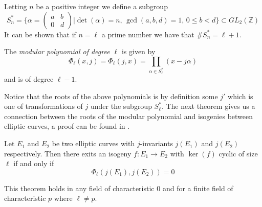 Letting $n$ be a positive integer we define a subgroup
$$ S_n^* = \{ \alpha = \begin{pmatrix} a & b \\ 0 & d \end{pmatrix} | \det(\alpha)=n,\, \gcd(a,b,d)=1,\, 0 \leq b < d \} \subset GL_2(\mathbb{Z}) $$
It can be shown that if $n = \ell$ a prime number we have that $\#S_n^* = \ell + 1$.

\begin{mydef}
 The \emph{modular polynomial of degree $\ell$} is given by
$$\Phi_\ell(x,j) = \Phi_\ell(j,x) = \prod_{\alpha \in S_\ell^*}(x - j \alpha) $$
and is of degree $\ell-1$.
\end{mydef}
Notice that the roots of the above polynomials is by definition some $j'$ which is one of transformations
of $j$ under the subgroup $S_\ell^*$. The next theorem gives us a connection between the roots of the
modular polynomial and isogenies between elliptic curves, a proof can be found in \cite{Lang2}.

\begin{thm} \label{modpol}
 Let $E_1$ and $E_2$ be two elliptic curves with $j$-invariants $j(E_1)$ and $j(E_2)$ respectively.
Then there exits an isogeny $f: E_1 \rightarrow E_2$ with $\ker(f)$ cyclic of size $\ell$ if and only if
$$\Phi_\ell(j(E_1), j(E_2)) = 0 $$
\end{thm}

This theorem holds in any field of characteristic $0$ and for a finite field of characteristic $p$ where
$\ell \neq p$.
